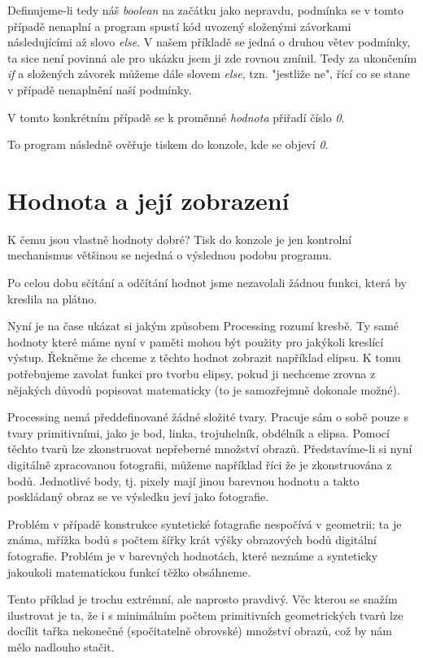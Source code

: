 \documentclass[11pt]{article}
\begin{document}
Definujeme-li tedy náš {\em boolean} na začátku jako nepravdu, podmínka se v tomto případě nenaplní a program spustí kód uvozený složenými závorkami následujícími až slovo {\em else}.
V našem příkladě se jedná o druhou větev podmínky, ta sice není povinná ale pro ukázku jsem ji zde rovnou zmínil. Tedy za ukončením {\em if} a složených závorek můžeme dále slovem {\em else}, tzn. "jestliže ne", řící co se stane v případě nenaplnění naší podmínky.

V tomto konkrétním případě se k proměnné {\em hodnota} přiřadí číslo {\em 0}.

To program následně ověřuje tiskem do konzole, kde se objeví {\em 0}.

\section{Hodnota a její zobrazení}

K čemu jsou vlastně hodnoty dobré? Tisk do konzole je jen kontrolní mechanismus většinou se nejedná o výslednou podobu programu.

Po celou dobu sčítání a odčítání hodnot jsme nezavolali žádnou funkci, která by kreslila na plátno.

Nyní je na čase ukázat si jakým způsobem Processing rozumí kresbě. Ty samé hodnoty které máme nyní v paměti mohou být použity pro jakýkoli kreslící výstup. Řekněme že chceme z těchto hodnot zobrazit například elipsu. K tomu potřebujeme zavolat funkci pro tvorbu elipsy, pokud ji nechceme zrovna z nějakých důvodů popisovat matematicky (to je samozřejmně dokonale možné).

Processing nemá předdefinované žádné složité tvary. Pracuje sám o sobě pouze s tvary primitivními, jako je bod, linka, trojuhelník, obdélník a elipsa. Pomocí těchto tvarů lze zkonstruovat nepřeberné množství obrazů. Představíme-li si nyní digitálně zpracovanou fotografii, můžeme například říci že je zkonstruována z bodů. Jednotlivé body, tj. pixely mají jinou barevnou hodnotu a takto poskládaný obraz se ve výsledku jeví jako fotografie.

Problém v případě konstrukce syntetické fotagrafie nespočívá v geometrii; ta je známa, mřížka bodů s počtem šířky krát výšky obrazových bodů digitální fotografie. Problém je v barevných hodnotách, které neznáme a synteticky jakoukoli matematickou funkcí těžko obsáhneme.

Tento příklad je trochu extrémní, ale naprosto pravdivý. Věc kterou se snažím ilustrovat je ta, že i s minimálním počtem primitivních geometrických tvarů lze docílit tařka nekonečné (spočitatelně obrovské) množství obrazů, což by nám mělo nadlouho stačit.
\end{document}
